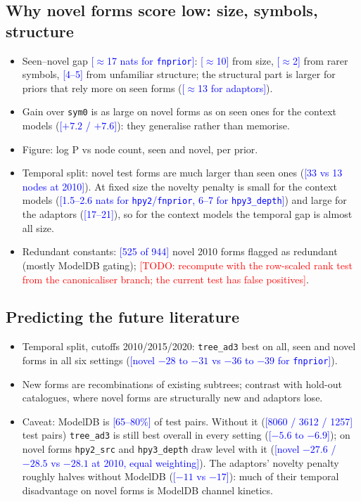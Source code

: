 \documentclass[11pt]{article}
\newcommand{\cur}[1]{\textcolor{blue}{[#1]}}
\newcommand{\todo}[1]{\textcolor{red}{[TODO: #1]}}
\begin{document}
\subsection{Why novel forms score low: size, symbols, structure}
\begin{itemize}
  \item Seen--novel gap \cur{$\approx$17 nats for \texttt{fnprior}}: \cur{$\approx$10} from size,
  \cur{$\approx$2} from rarer symbols, \cur{4--5} from unfamiliar structure; the structural part
  is larger for priors that rely more on seen forms (\cur{$\approx$13 for adaptors}).
  \item Gain over \texttt{sym0} is as large on novel forms as on seen ones for the context models
  (\cur{$+7.2$ / $+7.6$}): they generalise rather than memorise.
  \item Figure: log P vs node count, seen and novel, per prior.
  \item Temporal split: novel test forms are much larger than seen ones (\cur{33 vs 13 nodes at
  2010}). At fixed size the novelty penalty is small for the context models (\cur{1.5--2.6 nats for
  \texttt{hpy2}/\texttt{fnprior}, 6--7 for \texttt{hpy3\_depth}}) and large for the adaptors
  (\cur{17--21}), so for the context models the temporal gap is almost all size.
  \item Redundant constants: \cur{525 of 944} novel 2010 forms flagged as redundant (mostly ModelDB
  gating); \todo{recompute with the row-scaled rank test from the canonicaliser branch; the current
  test has false positives}.
\end{itemize}

\subsection{Predicting the future literature}
\begin{itemize}
  \item Temporal split, cutoffs 2010/2015/2020: \texttt{tree\_ad3} best on all, seen and novel
  forms in all six settings (\cur{novel $-28$ to $-31$ vs $-36$ to $-39$ for \texttt{fnprior}}).
  \item New forms are recombinations of existing subtrees; contrast with hold-out catalogues, where
  novel forms are structurally new and adaptors lose.
  \item Caveat: ModelDB is \cur{65--80\%} of test pairs. Without it (\cur{8060 / 3612 / 1257} test
  pairs) \texttt{tree\_ad3} is still best overall in every setting (\cur{$-5.6$ to $-6.9$}); on novel
  forms \texttt{hpy2\_src} and \texttt{hpy3\_depth} draw level with it (\cur{novel $-27.6$ / $-28.5$ vs
  $-28.1$ at 2010, equal weighting}). The adaptors' novelty penalty roughly halves without ModelDB
  (\cur{$-11$ vs $-17$}): much of their temporal disadvantage on novel forms is ModelDB channel
  kinetics.
\end{itemize}
\end{document}
